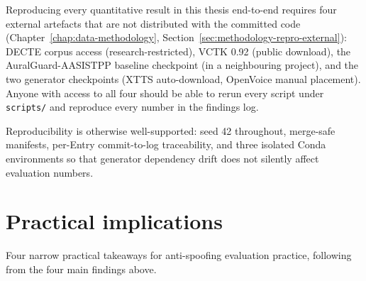 Reproducing every quantitative result in this thesis end-to-end
requires four external artefacts that are not distributed with the
committed code (Chapter~\ref{chap:data-methodology}, Section~\ref{sec:methodology-repro-external}): DECTE corpus access
(research-restricted), VCTK 0.92 (public download), the
AuralGuard-AASISTPP baseline checkpoint (in a neighbouring
project), and the two generator checkpoints (XTTS auto-download,
OpenVoice manual placement). Anyone with access to all four should
be able to rerun every script under \texttt{scripts/} and reproduce every
number in the findings log.

Reproducibility is otherwise well-supported: seed 42 throughout,
merge-safe manifests, per-Entry commit-to-log traceability, and
three isolated Conda environments so that generator dependency
drift does not silently affect evaluation numbers.


\section{Practical implications}
\label{sec:discussion-practical-meaning}

Four narrow practical takeaways for anti-spoofing evaluation
practice, following from the four main findings above.

